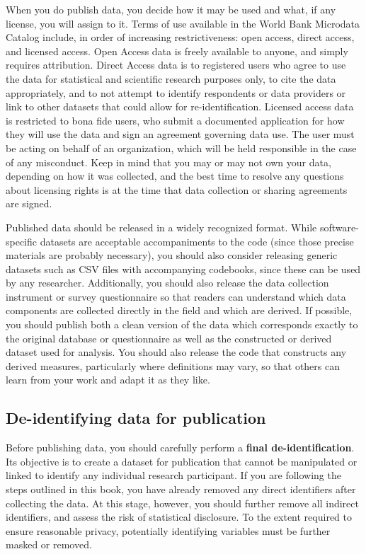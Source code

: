 When you do publish data, you decide how it may be used and what, if any license, you will assign to it.
Terms of use available in the World Bank Microdata Catalog include, in order of increasing restrictiveness: open access, direct access, and licensed access.
Open Access data is freely available to anyone, and simply requires attribution.
Direct Access data is to registered users who agree to use the data for statistical and scientific research purposes only, 
to cite the data appropriately, and to not attempt to identify respondents or data providers or link to other datasets that could allow for re-identification. 
Licensed access data is restricted to bona fide users, who submit a documented application for how they will use the data and sign an agreement governing data use. 
The user must be acting on behalf of an organization, which will be held responsible in the case of any misconduct.
Keep in mind that you may or may not own your data,
depending on how it was collected,
and the best time to resolve any questions about licensing rights
is at the time that data collection or sharing agreements are signed.

Published data should be released in a widely recognized format.
While software-specific datasets are acceptable accompaniments to the code
(since those precise materials are probably necessary),
you should also consider releasing generic datasets
such as CSV files with accompanying codebooks,
since these can be used by any researcher.
Additionally, you should also release
the data collection instrument or survey questionnaire
so that readers can understand which data components are
collected directly in the field and which are derived.
If possible, you should publish both a clean version of the data
which corresponds exactly to the original database or questionnaire
as well as the constructed or derived dataset used for analysis.
You should also release the code
that constructs any derived measures,
particularly where definitions may vary,
so that others can learn from your work and adapt it as they like.

\subsection{De-identifying data for publication}
Before publishing data,
you should carefully perform a \textbf{final de-identification}.
Its objective is to create a dataset for publication
that cannot be manipulated or linked to identify any individual research participant.
If you are following the steps outlined in this book,
you have already removed any direct identifiers after collecting the data.
At this stage, however, you should further remove
all indirect identifiers, and assess the risk of statistical disclosure.
To the extent required to ensure reasonable privacy,
potentially identifying variables must be further masked or removed.

